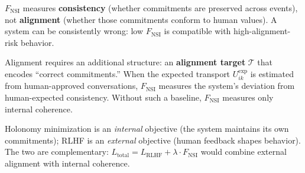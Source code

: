 \begin{remark}
\label{rem:consistency-alignment}
$F_{\mathrm{NSI}}$ measures \textbf{consistency} (whether commitments are preserved
across events), not \textbf{alignment} (whether those commitments conform to human
values). A system can be consistently wrong: low $F_{\mathrm{NSI}}$ is compatible with
high-alignment-risk behavior.

Alignment requires an additional structure: an \textbf{alignment target} $\mathcal{T}$
that encodes ``correct commitments.'' When the expected transport $U_{ik}^{\exp}$ is
estimated from human-approved conversations, $F_{\mathrm{NSI}}$ measures the system's
deviation from human-expected consistency. Without such a baseline, $F_{\mathrm{NSI}}$
measures only internal coherence.

Holonomy minimization is an \emph{internal} objective (the system maintains its own
commitments); RLHF is an \emph{external} objective (human feedback shapes behavior).
The two are complementary: $L_{\mathrm{total}} = L_{\mathrm{RLHF}} + \lambda \cdot
F_{\mathrm{NSI}}$ would combine external alignment with internal coherence.
\end{remark}
